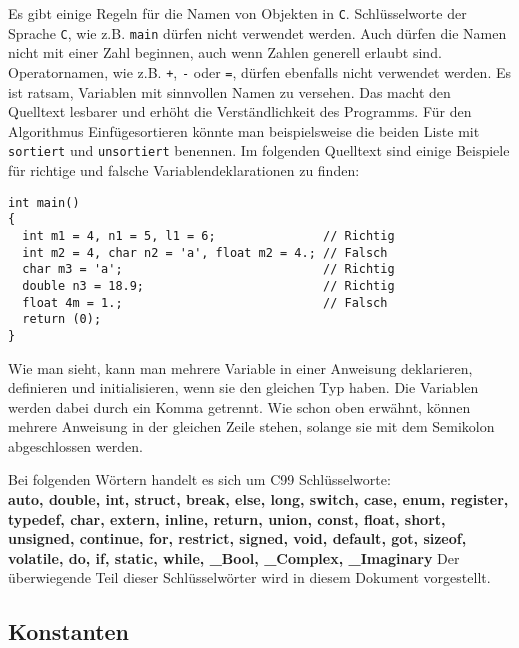 Es gibt einige Regeln für die Namen von Objekten in \texttt{C}. 
Schlüsselworte der Sprache \texttt{C}, wie z.B. \texttt{main} dürfen nicht verwendet werden.
Auch dürfen die Namen nicht mit einer Zahl beginnen, auch wenn Zahlen generell erlaubt sind.
Operatornamen, wie z.B. \verb|+|, \verb|-| oder \verb|=|, dürfen ebenfalls nicht verwendet werden.
Es ist ratsam, Variablen mit sinnvollen Namen zu versehen.
Das macht den Quelltext lesbarer und erhöht die Verständlichkeit des Programms.
Für den Algorithmus Einfügesortieren könnte man beispielsweise die beiden Liste mit \texttt{sortiert} und \texttt{unsortiert} benennen.
Im folgenden Quelltext sind einige Beispiele für richtige und falsche Variablendeklarationen zu finden:
\begin{lstlisting}
int main()
{
  int m1 = 4, n1 = 5, l1 = 6;               // Richtig
  int m2 = 4, char n2 = 'a', float m2 = 4.; // Falsch
  char m3 = 'a';                            // Richtig
  double n3 = 18.9;                         // Richtig
  float 4m = 1.;                            // Falsch
  return (0);
}
\end{lstlisting} 
Wie man sieht, kann man mehrere Variable in einer Anweisung deklarieren, definieren und initialisieren, wenn sie den gleichen Typ haben.
Die Variablen werden dabei durch ein Komma getrennt.
Wie schon oben erwähnt, können mehrere Anweisung in der gleichen Zeile stehen, solange sie mit dem Semikolon abgeschlossen werden.

Bei folgenden Wörtern handelt es sich um C99 Schlüsselworte:\\
\textbf{auto, double, int, struct, break, else, long, switch, case,
  enum, register, typedef, char, extern, inline, return, union, const, float,
  short, unsigned, continue, for, restrict, signed, void, default, got, sizeof,
  volatile, do, if, static, while, \_Bool, \_Complex, \_Imaginary}
Der überwiegende Teil dieser Schlüsselwörter wird in diesem Dokument vorgestellt.

\subsection{Konstanten}

